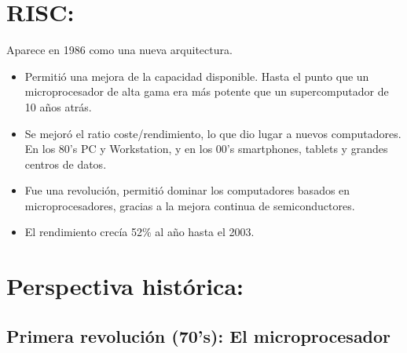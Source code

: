 \documentclass[12pt, twoside, openright]{report} %
\begin{document}
  \section{RISC:}

  Aparece en 1986 como una nueva arquitectura.

  \begin{itemize}
  
  \item
    Permitió una mejora de la capacidad disponible. Hasta el punto que
    un microprocesador de alta gama era más potente que un
    supercomputador de 10 años atrás.
  \item
    Se mejoró el ratio coste/rendimiento, lo que dio lugar a nuevos
    computadores. En los 80's PC y Workstation, y en los 00's
    smartphones, tablets y grandes centros de datos.
  \item
    Fue una revolución, permitió dominar los computadores basados en
    microprocesadores, gracias a la mejora continua de semiconductores.
  \item
    El rendimiento crecía 52\% al año hasta el 2003.
  \end{itemize}
\pagebreak
  \section{Perspectiva histórica:}

  \subsection{Primera revolución (70's): El microprocesador}
\end{document}
